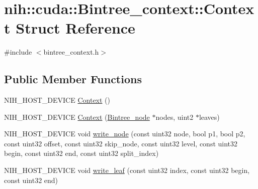 \hypertarget{structnih_1_1cuda_1_1_bintree__context_1_1_context}{
\section{nih\-:\-:cuda\-:\-:\-Bintree\-\_\-context\-:\-:\-Context \-Struct \-Reference}
\label{structnih_1_1cuda_1_1_bintree__context_1_1_context}
}


{\ttfamily \#include $<$bintree\-\_\-context.\-h$>$}

\subsection*{\-Public \-Member \-Functions}
\begin{DoxyCompactItemize}
\item 
\-N\-I\-H\-\_\-\-H\-O\-S\-T\-\_\-\-D\-E\-V\-I\-C\-E \hyperlink{structnih_1_1cuda_1_1_bintree__context_1_1_context_a38ac72182031ce53aebdd6448969f667}{\-Context} ()
\item 
\-N\-I\-H\-\_\-\-H\-O\-S\-T\-\_\-\-D\-E\-V\-I\-C\-E \hyperlink{structnih_1_1cuda_1_1_bintree__context_1_1_context_a5abd5cad3dee1ff0c9baa4b3f4226d89}{\-Context} (\hyperlink{structnih_1_1_bintree__node}{\-Bintree\-\_\-node} $\ast$nodes, uint2 $\ast$leaves)
\item 
\-N\-I\-H\-\_\-\-H\-O\-S\-T\-\_\-\-D\-E\-V\-I\-C\-E void \hyperlink{structnih_1_1cuda_1_1_bintree__context_1_1_context_a95d868e44c904ff1f16f2a7eb9eddb93}{write\-\_\-node} (const uint32 node, bool p1, bool p2, const uint32 offset, const uint32 skip\-\_\-node, const uint32 level, const uint32 begin, const uint32 end, const uint32 split\-\_\-index)
\item 
\-N\-I\-H\-\_\-\-H\-O\-S\-T\-\_\-\-D\-E\-V\-I\-C\-E void \hyperlink{structnih_1_1cuda_1_1_bintree__context_1_1_context_aa262fa95c49e0375e580f2344ce3bc83}{write\-\_\-leaf} (const uint32 index, const uint32 begin, const uint32 end)
\end{DoxyCompactItemize}
